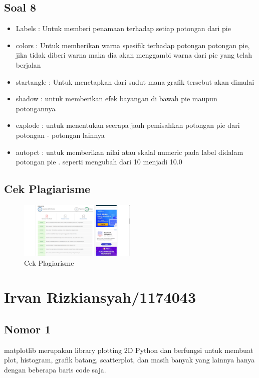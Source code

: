 	\subsection{Soal 8}
	\begin{itemize}
		\item Labels : Untuk memberi penamaan terhadap setiap potongan dari pie
		\item colors : Untuk memberikan warna spesifik terhadap potongan potongan pie, jika tidak diberi warna maka dia akan menggambi warna dari pie yang telah berjalan
		\item startangle : Untuk menetapkan dari sudut mana grafik tersebut akan dimulai
		\item shadow : untuk memberikan efek bayangan di bawah pie maupun potongannya
		\item explode : untuk menentukan seerapa jauh pemisahkan potongan pie dari potongan - potongan lainnya
		\item autopct : untuk memberikan nilai atau skalal numeric pada label didalam potongan pie . seperti mengubah dari 10 menjadi 10.0
	\end{itemize}

	\subsection{Cek Plagiarisme}
	
	\begin{figure}[ht]
            \centerline{\includegraphics[width=0.5\textwidth]{figures/6/1174040/Teori/1174040_plagiat.png}}
            \caption{Cek Plagiarisme}
            \label{1174040_chap6_plagiat}
            \end{figure}
			
\section{Irvan Rizkiansyah/1174043}
	\subsection{Nomor 1}
		matplotlib merupakan library plotting 2D Python dan berfungsi untuk membuat plot, histogram, grafik batang, scatterplot, dan masih banyak yang lainnya hanya dengan beberapa baris code saja.
		
